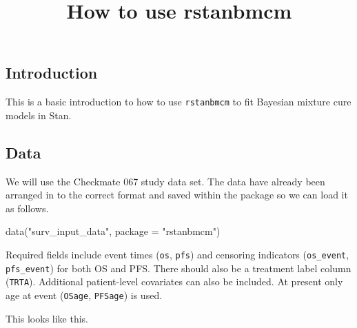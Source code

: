 \documentclass[
]{article}
\title{How to use rstanbmcm}
\author{}
\date{\vspace{-2.5em}}
\newenvironment{Shaded}{\begin{snugshade}}{\end{snugshade}}
\newcommand{\AttributeTok}[1]{\textcolor[rgb]{0.77,0.63,0.00}{#1}}
\newcommand{\FunctionTok}[1]{\textcolor[rgb]{0.00,0.00,0.00}{#1}}
\newcommand{\NormalTok}[1]{#1}
\newcommand{\StringTok}[1]{\textcolor[rgb]{0.31,0.60,0.02}{#1}}
\begin{document}
\maketitle

\hypertarget{introduction}{%
\subsection{Introduction}\label{introduction}}

This is a basic introduction to how to use \texttt{rstanbmcm} to fit
Bayesian mixture cure models in Stan.

\hypertarget{data}{%
\subsection{Data}\label{data}}

We will use the Checkmate 067 study data set. The data have already been
arranged in to the correct format and saved within the package so we can
load it as follows.

\begin{Shaded}
\begin{Highlighting}[]
\FunctionTok{data}\NormalTok{(}\StringTok{"surv\_input\_data"}\NormalTok{, }\AttributeTok{package =} \StringTok{"rstanbmcm"}\NormalTok{)}
\end{Highlighting}
\end{Shaded}

Required fields include event times (\texttt{os}, \texttt{pfs}) and
censoring indicators (\texttt{os\_event}, \texttt{pfs\_event}) for both
OS and PFS. There should also be a treatment label column
(\texttt{TRTA}). Additional patient-level covariates can also be
included. At present only age at event (\texttt{OSage}, \texttt{PFSage})
is used.

This looks like this.
\end{document}
